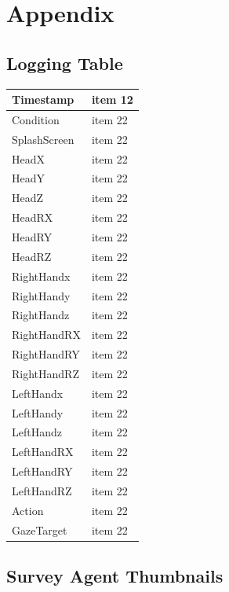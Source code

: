 \section{Appendix}

\subsection{Logging Table}
\label{subsection:appendixLogging}

\begin{tabu} to 0.8\textwidth { | X[l] | X[c] | }
 \hline
 Timestamp& item 12 \\
 \hline
 Condition  & item 22    \\
\hline
 SplashScreen  & item 22    \\
\hline
 HeadX  & item 22    \\
\hline
 HeadY  & item 22    \\
\hline
 HeadZ  & item 22    \\
\hline
 HeadRX  & item 22    \\
\hline
 HeadRY  & item 22    \\
\hline
 HeadRZ  & item 22    \\
\hline
 RightHandx  & item 22    \\
\hline
 RightHandy  & item 22    \\
\hline
 RightHandz  & item 22    \\
\hline
 RightHandRX  & item 22    \\
\hline
 RightHandRY  & item 22    \\
\hline
 RightHandRZ  & item 22    \\
\hline
LeftHandx  & item 22    \\
\hline
 LeftHandy  & item 22    \\
\hline
 LeftHandz  & item 22    \\
\hline
 LeftHandRX  & item 22    \\
\hline
 LeftHandRY  & item 22    \\
\hline
 LeftHandRZ  & item 22    \\
\hline
 Action  & item 22    \\
\hline
 GazeTarget  & item 22    \\
\hline
\end{tabu}

\subsection{Survey Agent Thumbnails}
\label{subsection:thumbnails}
